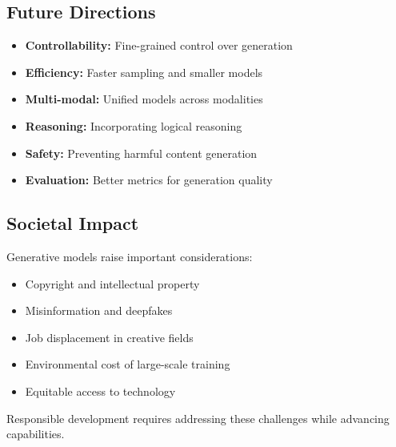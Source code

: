 \subsection{Future Directions}

\begin{itemize}
    \item \textbf{Controllability:} Fine-grained control over generation
    \item \textbf{Efficiency:} Faster sampling and smaller models
    \item \textbf{Multi-modal:} Unified models across modalities
    \item \textbf{Reasoning:} Incorporating logical reasoning
    \item \textbf{Safety:} Preventing harmful content generation
    \item \textbf{Evaluation:} Better metrics for generation quality
\end{itemize}

\subsection{Societal Impact}

Generative models raise important considerations:
\begin{itemize}
    \item Copyright and intellectual property
    \item Misinformation and deepfakes
    \item Job displacement in creative fields
    \item Environmental cost of large-scale training
    \item Equitable access to technology
\end{itemize}

Responsible development requires addressing these challenges while advancing capabilities.





